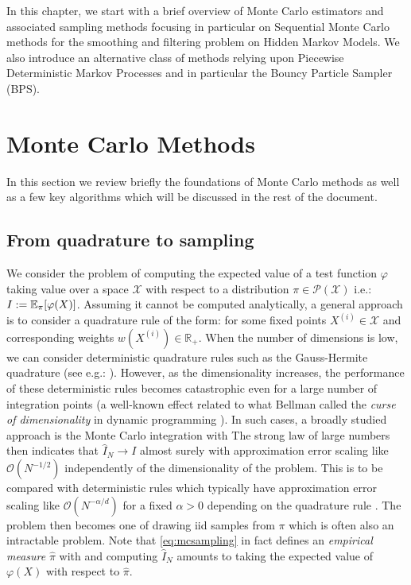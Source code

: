 
In this chapter, we start with a brief overview of Monte Carlo estimators and associated sampling methods focusing in particular on Sequential Monte Carlo methods for the smoothing and filtering problem on Hidden Markov Models. We also introduce an alternative class of methods relying upon Piecewise Deterministic Markov Processes and in particular the Bouncy Particle Sampler (BPS). 

\section{\label{sec:MC+SMC}Monte Carlo Methods}
In this section we review briefly the foundations of Monte Carlo methods as well as a few key algorithms which will be discussed in the rest of the document.

\subsection{From quadrature to sampling}
We consider the problem of computing the expected value of a test function $\varphi$ taking value over a space $\mathcal X$ with respect to a distribution $\pi\in\mathcal P(\mathcal X)$ i.e.: $I:=\mathbb E_\pi[\varphi(X)]$. Assuming it cannot be computed analytically, a general approach is to consider a quadrature rule of the form:
%
%
for some fixed points $X^{(i)}\in\mathcal X$ and corresponding weights $w(X^{(i)})\in\mathbb R_+$. 
When the number of dimensions is low, we can consider deterministic quadrature rules such as the Gauss-Hermite quadrature (see e.g.: \citet{davis75}). However, as the dimensionality increases, the performance of these deterministic rules becomes catastrophic even for a large number of integration points (a well-known effect related to what Bellman called the \emph{curse of dimensionality} in dynamic programming \citep{bellman57,bengtsson08}). 
In such cases, a broadly studied approach is the Monte Carlo integration with
%
%
The strong law of large numbers then indicates that $\widehat I_N\to I$ almost surely with approximation error scaling like $\mathcal O(N^{-1/2})$ independently of the dimensionality of the problem. This is to be compared with deterministic rules which typically have approximation error scaling like $\mathcal O(N^{-\alpha/d})$ for a fixed $\alpha>0$ depending on the quadrature rule \citep{caflisch98}. The problem then becomes one of drawing iid samples from $\pi$ which is often also an intractable problem. Note that \eqref{eq:mcsampling} in fact defines an \emph{empirical measure} $\hat \pi$ with
%
%
and computing $\hat I_{N}$ amounts to taking the expected value of $\varphi(X)$ with respect to $\hat\pi$.

